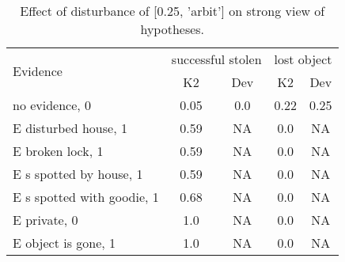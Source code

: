 \begin{table}\begin{tabular}{l|cc|cc}\toprule\multirow{2}{*}{Evidence} & \multicolumn{2}{c}{successful stolen}& \multicolumn{2}{c}{lost object}\\& {K2} & {Dev}& {K2} & {Dev}\\\midrule
no evidence, 0 & \cellcolor{Bittersweet}0.05&\cellcolor{Bittersweet}0.0&0.22&0.25\\E disturbed house, 1 & \cellcolor{Bittersweet}0.59&\cellcolor{Bittersweet}NA&\cellcolor{Bittersweet}0.0&\cellcolor{Bittersweet}NA\\E broken lock, 1 & \cellcolor{Bittersweet}0.59&\cellcolor{Bittersweet}NA&\cellcolor{Bittersweet}0.0&\cellcolor{Bittersweet}NA\\E s spotted by house, 1 & \cellcolor{Bittersweet}0.59&\cellcolor{Bittersweet}NA&\cellcolor{Bittersweet}0.0&\cellcolor{Bittersweet}NA\\E s spotted with goodie, 1 & \cellcolor{Bittersweet}0.68&\cellcolor{Bittersweet}NA&\cellcolor{Bittersweet}0.0&\cellcolor{Bittersweet}NA\\E private, 0 & \cellcolor{Bittersweet}1.0&\cellcolor{Bittersweet}NA&\cellcolor{Bittersweet}0.0&\cellcolor{Bittersweet}NA\\E object is gone, 1 & \cellcolor{Bittersweet}1.0&\cellcolor{Bittersweet}NA&\cellcolor{Bittersweet}0.0&\cellcolor{Bittersweet}NA\\\bottomrule\end{tabular}\caption{Effect of disturbance of [0.25, 'arbit'] on strong view of hypotheses.}\end{table}